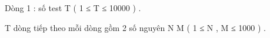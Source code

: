 Dòng 1 : số test T ( 1 ≤ T ≤ 10000 ) .   


   T dòng tiếp theo mỗi dòng gồm 2 số nguyên N M ( 1 ≤ N , M ≤ 1000 ) .